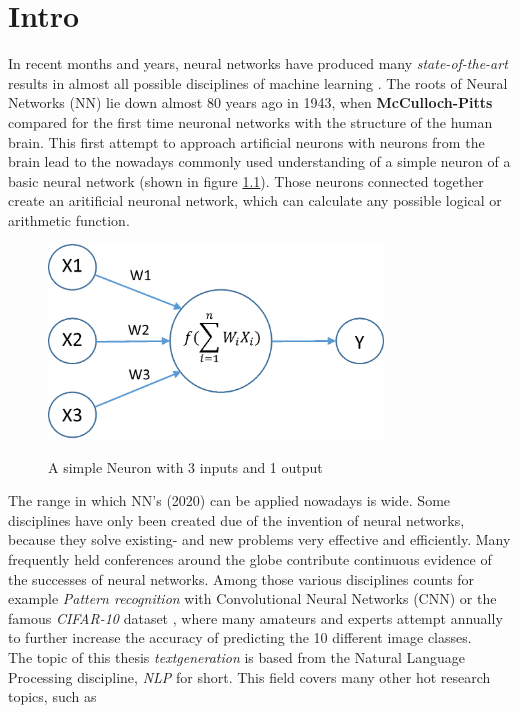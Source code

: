 \chapter{Intro}\label{ch:intro}

In recent months and years, neural networks have produced many \textit{state-of-the-art} results in almost all possible disciplines of machine learning \cite{NTG2}. The roots of Neural Networks (NN) lie down almost 80 years ago in 1943, when \textbf{McCulloch-Pitts} \cite{NN} compared for the first time neuronal networks with the structure of the human brain. This first attempt to approach artificial neurons with neurons from the brain lead to the nowadays commonly used understanding of a simple neuron of a basic neural network (shown in figure \ref{neuron}). Those neurons connected together create an aritificial neuronal network, which can calculate any possible logical or arithmetic function. 

\begin{figure}
  \begin{center}
  \includegraphics[width=3.5in]{photos/neuron}\\
  \caption{A simple Neuron with 3 inputs and 1 output \cite{neuron}}\label{neuron}
  \end{center}
\end{figure}

The range in which NN's (2020) can be applied nowadays is wide. Some disciplines have only been created due of the invention of neural networks, because they solve existing- and new problems very effective and efficiently. Many frequently held conferences around the globe contribute continuous evidence of the successes of neural networks. Among those various disciplines counts for example \textit{Pattern recognition} with Convolutional Neural Networks (CNN) \cite{cnn} or the famous \textit{CIFAR-10} dataset \cite{cifar}, where many amateurs \cite{tim} and experts attempt annually to further increase the accuracy of predicting the 10 different image classes. \\
The topic of this thesis \textit{textgeneration} is based from the Natural Language Processing discipline, \textit{NLP} for short. This field covers many other hot research topics, such as 

